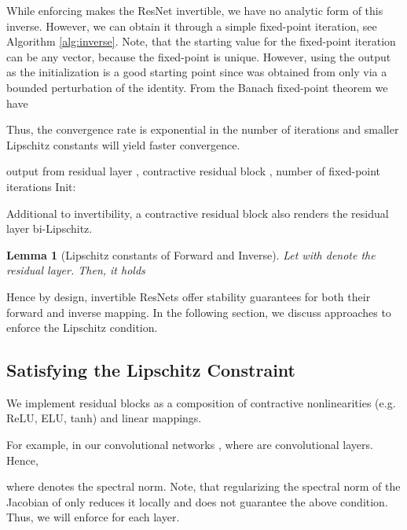 \documentclass{article}
\newtheorem{lemma}[theorem]{Lemma}
\begin{document}
While enforcing  makes the ResNet invertible, we have no analytic form of this inverse. However, we can obtain it through a simple fixed-point iteration, see Algorithm \ref{alg:inverse}. Note, that the starting value for the fixed-point iteration can be any vector, because the fixed-point is unique. However, using the output  as the initialization   is a good starting point since  was obtained from  only via a bounded perturbation of the identity. From the Banach fixed-point theorem we have

Thus, the convergence rate is exponential in the number of iterations  and smaller Lipschitz constants will yield faster convergence.
\begin{algorithm}[t]
   \caption{Inverse of i-ResNet layer via fixed-point iteration.}
   \label{alg:inverse}
\begin{algorithmic}
    output from residual layer , contractive residual block , number of fixed-point iterations 
   \STATE Init: 
   \FOR{}
   \STATE 
   \ENDFOR
\end{algorithmic}
\end{algorithm}

Additional to invertibility, a contractive residual block also renders the residual layer bi-Lipschitz. 
\begin{lemma}[Lipschitz constants of Forward and Inverse]
\label{thm:lipForwardInverse}
Let  with  denote the residual layer. Then, it holds 

\end{lemma}
Hence by design, invertible ResNets offer stability guarantees for both their forward and inverse mapping. In the following section, we discuss approaches to enforce the Lipschitz condition.

\subsection{Satisfying the Lipschitz Constraint}

We implement residual blocks as a composition of contractive nonlinearities  (e.g. ReLU, ELU, tanh) and linear mappings. 

For example, in our convolutional networks , where  are convolutional layers. Hence,

where  denotes the spectral norm. Note, that regularizing the spectral norm of the Jacobian of  \citep{Sokolic} only reduces it locally and does not guarantee the above condition. Thus, we will enforce  for each layer.
\end{document}
